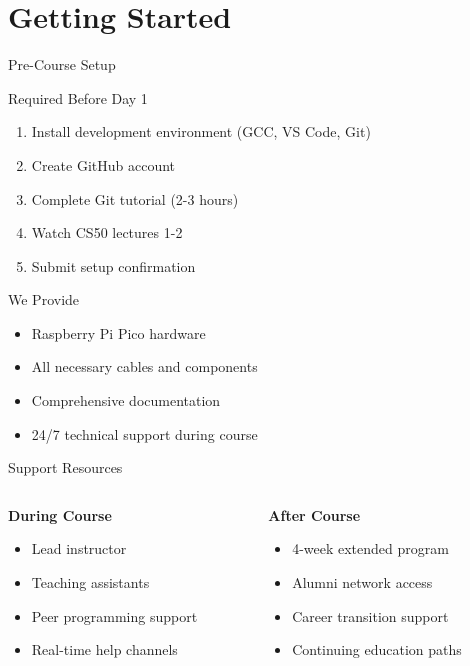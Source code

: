 \documentclass[aspectratio=169]{beamer}
\begin{document}
\section{Getting Started}

\begin{frame}{Pre-Course Setup}
  \begin{alertblock}{Required Before Day 1}
    \begin{enumerate}
      \item Install development environment (GCC, VS Code, Git)
      \item Create GitHub account
      \item Complete Git tutorial (2-3 hours)
      \item Watch CS50 lectures 1-2
      \item Submit setup confirmation
    \end{enumerate}
  \end{alertblock}

  \begin{block}{We Provide}
    \begin{itemize}
      \item Raspberry Pi Pico hardware
      \item All necessary cables and components
      \item Comprehensive documentation
      \item 24/7 technical support during course
    \end{itemize}
  \end{block}
\end{frame}

\begin{frame}{Support Resources}
  \begin{columns}
    \begin{column}{0.5\textwidth}
      \textbf{During Course}
      \begin{itemize}
        \item Lead instructor
        \item Teaching assistants
        \item Peer programming support
        \item Real-time help channels
      \end{itemize}
    \end{column}
    \begin{column}{0.5\textwidth}
      \textbf{After Course}
      \begin{itemize}
        \item 4-week extended program
        \item Alumni network access
        \item Career transition support
        \item Continuing education paths
      \end{itemize}
    \end{column}
  \end{columns}
\end{frame}
\end{document}
